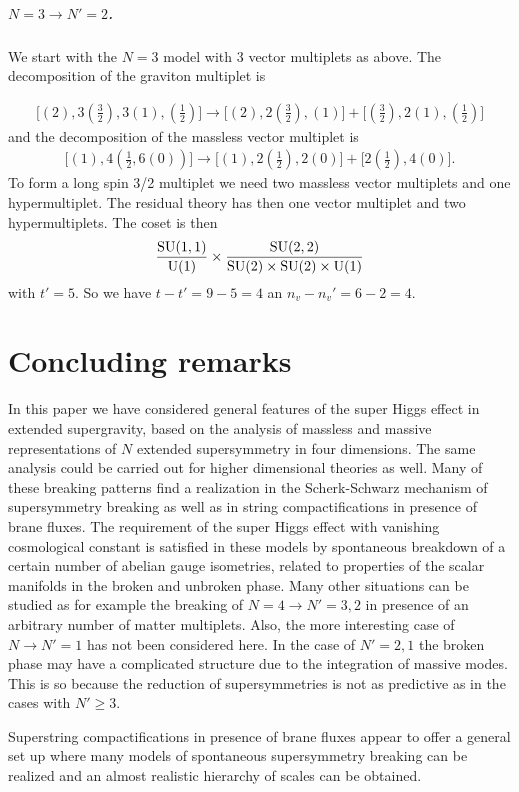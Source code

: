 \documentclass[a4paper,12pt]{article}
\begin{document}
\subparagraph{$N=3\rightarrow N'=2$.} We start with the $N=3$
model with 3 vector multiplets as above. The decomposition of the
graviton multiplet is

\begin{eqnarray*}\bigl[(2), 3(\frac{3}{2}), 3(1), (\frac{1}{2})\bigr]\rightarrow
\bigl[(2), 2(\frac{3}{2}), (1)\bigr]+\bigl[(\frac{3}{2}), 2(1),
(\frac{1}{2})\bigr]\end{eqnarray*} and the decomposition of the
massless vector multiplet is
\begin{eqnarray*}\bigl[(1), 4(\frac{1}{2}, 6(0))\bigr]\rightarrow
\bigl[(1), 2(\frac{1}{2}), 2(0)\bigr]+\bigl[2(\frac{1}{2}),
4(0)\bigr].\end{eqnarray*} To form a long spin 3/2 multiplet we
need two massless vector multiplets and one hypermultiplet.  The
residual theory has then one vector multiplet and two
hypermultiplets. The coset is then
$$\frac{\mathrm{SU}(1,1)}{\mathrm{U}(1)}\times\frac{\mathrm{SU}(2,2)}{\mathrm{SU}(2)\times\mathrm{SU}(2)\times
\mathrm{U}(1) } $$ with $t'=5$. So we have $t-t'=9-5=4$ an
$n_v-n_v'=6-2=4$.

\section{Concluding remarks}

In this paper we have considered general features of the super
Higgs effect in extended supergravity,  based on the analysis of
massless and massive representations of $N$ extended supersymmetry
in four dimensions. The same analysis could be carried out for
higher dimensional theories as well. Many of these breaking
patterns find a realization in the Scherk-Schwarz mechanism of
supersymmetry breaking as well as in string compactifications in
presence of brane fluxes. The requirement of the super Higgs
effect with vanishing cosmological constant is satisfied in these
models by spontaneous breakdown of a certain number of abelian
gauge isometries, related to properties of the scalar manifolds in
the broken and unbroken phase. Many other situations can be
studied as for example the breaking of $N=4\rightarrow N'=3,2$ in
presence of an arbitrary number of matter multiplets. Also, the
more interesting case of $N\rightarrow N'=1$ has not been
considered here. In the case of $N'=2,1$ the broken phase may have
a complicated structure due to the integration of massive modes.
This is so because the reduction of supersymmetries is not as
predictive as in the cases with $N'\geq 3$.

Superstring compactifications in presence of brane fluxes appear
to offer  a general set up \cite{fp,kst} where many models of
spontaneous supersymmetry breaking can be realized and  an almost
realistic hierarchy of scales can be obtained.
\end{document}
